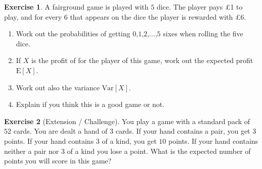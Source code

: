 \documentclass[
]{book}
\theoremstyle{definition}
\theoremstyle{definition}
\theoremstyle{definition}
\newtheorem{exercise}{Exercise}[chapter]
\theoremstyle{definition}
\theoremstyle{remark}
\begin{document}
\begin{exercise}

A fairground game is played with \(5\) dice. The player pays £1 to play, and for every \(6\) that appears on the dice the player is rewarded with £\(6\).

\begin{enumerate}
\def\labelenumi{\alph{enumi})}
\item
  Work out the probabilities of getting \(0\),\(1\),\(2\),\(\dots\),\(5\) sixes when rolling the five dice.
\item
  If \(X\) is the profit of for the player of this game, work out the expected profit \(\text{E}[X]\).
\item
  Work out also the variance \(\text{Var}[X]\).
\item
  Explain if you think this is a good game or not.
\end{enumerate}

\end{exercise}

\begin{exercise}[Extension / Challenge]
You play a game with a standard pack of \(52\) cards. You are dealt a hand of \(3\) cards. If your hand contains a pair, you get \(3\) points. If your hand contains \(3\) of a kind, you get \(10\) points. If your hand contains neither a pair nor \(3\) of a kind you lose a point. What is the expected number of points you will score in this game?
\end{exercise}

  
\end{document}
